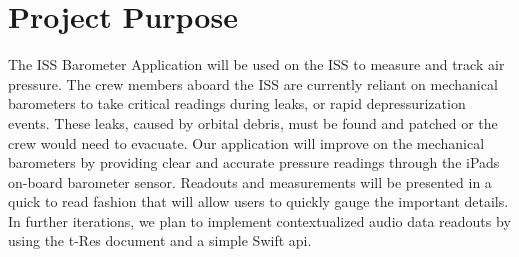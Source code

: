 \documentclass[onecolumn, draftclsnofoot,10pt, compsoc]{IEEEtran}
\def \CapstoneProjectName{ISS Barometer App }
\begin{document}
\begin{titlepage}
\begin{singlespace}
\begin{abstract}
        One very important aspect for the success of life in near vacuum is sustained air pressure inside the modules.
        This air pressure is monitored by mechanical barometers, called Manovacometers, which must be visually monitored, and are no longer available.
        The \CapstoneProjectName seeks to provide a suitable replacement for the current barometer device aboard the International Space Station.
        This document will serve to introduce the \CapstoneProjectName, and will detail the problem, the solution, and the success metrics of the project.
        The sections include the Definition of the Problem, Definition of Project, and the Metrics of Success.
        \end{abstract}
    \end{singlespace}
\end{titlepage}
\newpage
{}
\tableofcontents
\clearpage

\section{Project Purpose}
The ISS Barometer Application will be used on the ISS to measure and track air pressure.
The crew members aboard the ISS are currently reliant on mechanical barometers to take critical readings during leaks, or rapid depressurization events.
These leaks, caused by orbital debris, must be found and patched or the crew would need to evacuate.
Our application will improve on the mechanical barometers by providing clear and accurate pressure readings through the iPads on-board barometer sensor.
Readouts and measurements will be presented in a quick to read fashion that will allow users to quickly gauge the important details.
In further iterations, we plan to implement contextualized audio data readouts by using the t-Res document and a simple Swift api.
\end{document}
